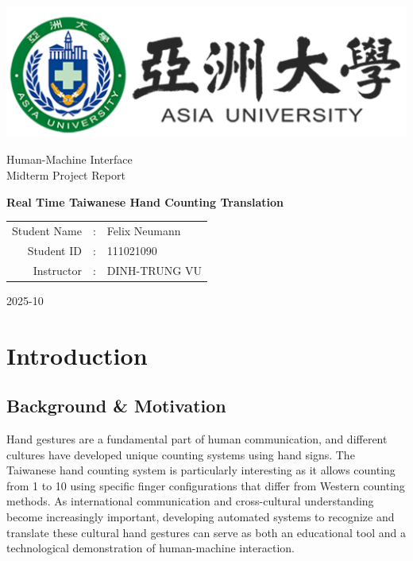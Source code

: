 \documentclass{article}
\begin{document}
\begin{center}

\includegraphics{asia.png}

\vspace{3cm}

{\Huge Human-Machine Interface\\Midterm Project Report}\\
	
\vspace{4cm}
		
{\fontsize{30}{0}\selectfont \textbf{Real Time Taiwanese Hand Counting Translation}}

\vspace{3cm}

\setlength{\tabcolsep}{2pt}
\begin{tabular}{rcl}
Student Name&:& Felix Neumann\\
Student ID&:&111021090\\
Instructor&:&DINH-TRUNG VU\\
\end{tabular}

\vspace{3cm}

2025-10

\end{center}

\pagebreak

\onehalfspacing

\tableofcontents

\section{Introduction}

\subsection{Background \& Motivation}

Hand gestures are a fundamental part of human communication, and different cultures have developed unique counting systems using hand signs. The Taiwanese hand counting system is particularly interesting as it allows counting from 1 to 10 using specific finger configurations that differ from Western counting methods. As international communication and cross-cultural understanding become increasingly important, developing automated systems to recognize and translate these cultural hand gestures can serve as both an educational tool and a technological demonstration of human-machine interaction.
\end{document}
